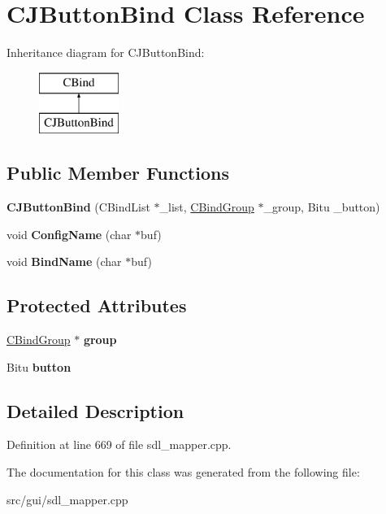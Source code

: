 \hypertarget{classCJButtonBind}{\section{C\-J\-Button\-Bind Class Reference}
\label{classCJButtonBind}
}
Inheritance diagram for C\-J\-Button\-Bind\-:\begin{figure}[H]
\begin{center}
\leavevmode
\includegraphics[height=2.000000cm]{classCJButtonBind}
\end{center}
\end{figure}
\subsection*{Public Member Functions}
\begin{DoxyCompactItemize}
\item 
\hypertarget{classCJButtonBind_a087e9681558df38907c7d57a373ec115}{{\bfseries C\-J\-Button\-Bind} (C\-Bind\-List $\ast$\-\_\-list, \hyperlink{classCBindGroup}{C\-Bind\-Group} $\ast$\-\_\-group, Bitu \-\_\-button)}\label{classCJButtonBind_a087e9681558df38907c7d57a373ec115}

\item 
\hypertarget{classCJButtonBind_a0aae6d69719dfb37dc2e1ed722663ec0}{void {\bfseries Config\-Name} (char $\ast$buf)}\label{classCJButtonBind_a0aae6d69719dfb37dc2e1ed722663ec0}

\item 
\hypertarget{classCJButtonBind_a948fa272e3164f85522f7b1ece2ae49f}{void {\bfseries Bind\-Name} (char $\ast$buf)}\label{classCJButtonBind_a948fa272e3164f85522f7b1ece2ae49f}

\end{DoxyCompactItemize}
\subsection*{Protected Attributes}
\begin{DoxyCompactItemize}
\item 
\hypertarget{classCJButtonBind_ade264023f83ad0202a6c5a2340d46833}{\hyperlink{classCBindGroup}{C\-Bind\-Group} $\ast$ {\bfseries group}}\label{classCJButtonBind_ade264023f83ad0202a6c5a2340d46833}

\item 
\hypertarget{classCJButtonBind_a6ef33ff006d574b8ea0df3ac18bf1a7a}{Bitu {\bfseries button}}\label{classCJButtonBind_a6ef33ff006d574b8ea0df3ac18bf1a7a}

\end{DoxyCompactItemize}


\subsection{Detailed Description}


Definition at line 669 of file sdl\-\_\-mapper.\-cpp.



The documentation for this class was generated from the following file\-:\begin{DoxyCompactItemize}
\item 
src/gui/sdl\-\_\-mapper.\-cpp\end{DoxyCompactItemize}
